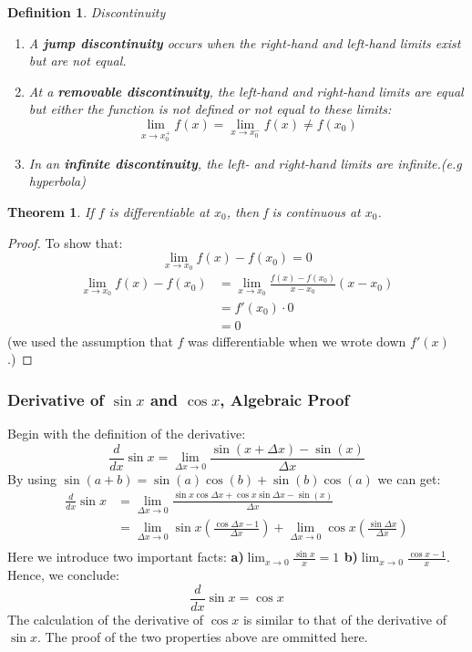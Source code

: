 \documentclass[10pt, a4paper]{article}
\newtheorem{theorem}{Theorem}
\newtheorem{definition}{Definition}
\begin{document}
\begin{definition}
    Discontinuity
    \begin{enumerate}
        \item A \textbf{jump discontinuity} occurs when the right-hand and left-hand limits exist but are not equal.
        \item At a \textbf{removable discontinuity}, the left-hand and right-hand limits are equal but
        either the function is not defined or not equal to these limits:
        \[
            \lim_{x\to x_0^+}f(x)=\lim_{x\to x_0^-}f(x)\neq f(x_0)    
        \]
        \item In an \textbf{infinite discontinuity}, the left- and right-hand limits are infinite.(e.g hyperbola)
    \end{enumerate}
\end{definition}

\begin{theorem}
    If $f$ is differentiable at $x_0$, then f is continuous at $x_0$.
\end{theorem}
\begin{proof}
    To show that:
    \[
        \lim_{x\to x_0}f(x) - f(x_0) = 0    
    \]
    \begin{align*}
        \lim_{x\to x_0}f(x) - f(x_0) &= \lim_{x\to x_0}\frac{f(x)-f(x_0)}{x-x_0}(x-x_0)\\
        &= f'(x_0)\cdot 0\\
        &= 0
    \end{align*}
    (we used the assumption that $f$ was differentiable when we wrote down $f'(x)$.)
\end{proof}

\subsubsection*{Derivative of $\sin x$ and $\cos x$, Algebraic Proof}
Begin with the definition of the derivative:
\[
    \frac{d}{dx}\sin x=\lim_{\Delta x\to0}\frac{\sin(x+\Delta x)-\sin(x)}{\Delta x}
\]
By using $\sin(a+b)=\sin(a)\cos(b)+\sin(b)\cos(a)$ we can get:
\[
\begin{aligned}
    \frac{d}{dx}\sin x &=\lim_{\Delta x\to0}\frac{\sin x\cos\Delta x+\cos x\sin\Delta x-\sin(x)}{\Delta x}\\
    &= \lim_{\Delta x\to0}\sin x\left(\frac{\cos\Delta x-1}{\Delta x}\right)+\lim_{\Delta x\to0}\cos x\left(\frac{\sin\Delta x}{\Delta x}\right)\\
\end{aligned}
\]
Here we introduce two important facts: \textbf{a)$\lim_{x\to 0}\frac{\sin x}{x} = 1$ b)$\lim_{x\to 0}\frac{\cos x -1}{x}$}.
Hence, we conclude:
\[
    \frac{d}{dx}\sin x = \cos x
\]
The calculation of the derivative of $\cos x$ is similar to that of the derivative of $\sin x$. 
The proof of the two properties above are ommitted here.
\end{document}
